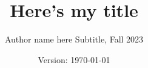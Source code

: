 \documentclass[12pt]{article} %
\title {Here's my title}
\author {Author name here 
\newline
Subtitle, Fall 2023}
\date{Version: \today}
\begin{document}
%
%
%


%

%
\begin{comment}

\end{comment}
    


    
    
\begin{comment}





\end{comment}





\begin{comment}



\end{comment}




\begin{comment}

\end{comment}
\end{document}
